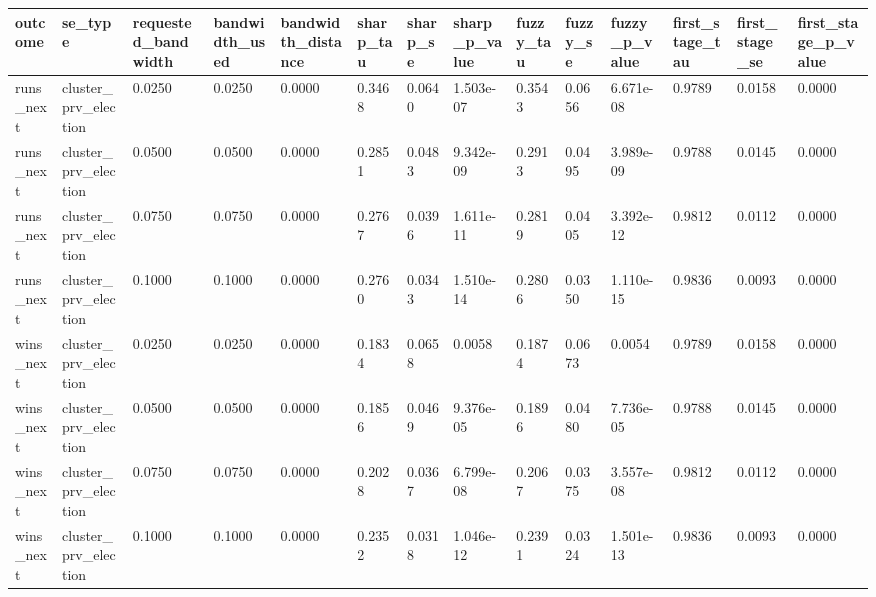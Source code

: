 \begin{tabular}{llllllllllllll}
\toprule
outcome & se\_type & requested\_bandwidth & bandwidth\_used & bandwidth\_distance & sharp\_tau & sharp\_se & sharp\_p\_value & fuzzy\_tau & fuzzy\_se & fuzzy\_p\_value & first\_stage\_tau & first\_stage\_se & first\_stage\_p\_value \\
\midrule
runs\_next & cluster\_prv\_election & 0.0250 & 0.0250 & 0.0000 & 0.3468 & 0.0640 & 1.503e-07 & 0.3543 & 0.0656 & 6.671e-08 & 0.9789 & 0.0158 & 0.0000 \\
runs\_next & cluster\_prv\_election & 0.0500 & 0.0500 & 0.0000 & 0.2851 & 0.0483 & 9.342e-09 & 0.2913 & 0.0495 & 3.989e-09 & 0.9788 & 0.0145 & 0.0000 \\
runs\_next & cluster\_prv\_election & 0.0750 & 0.0750 & 0.0000 & 0.2767 & 0.0396 & 1.611e-11 & 0.2819 & 0.0405 & 3.392e-12 & 0.9812 & 0.0112 & 0.0000 \\
runs\_next & cluster\_prv\_election & 0.1000 & 0.1000 & 0.0000 & 0.2760 & 0.0343 & 1.510e-14 & 0.2806 & 0.0350 & 1.110e-15 & 0.9836 & 0.0093 & 0.0000 \\
wins\_next & cluster\_prv\_election & 0.0250 & 0.0250 & 0.0000 & 0.1834 & 0.0658 & 0.0058 & 0.1874 & 0.0673 & 0.0054 & 0.9789 & 0.0158 & 0.0000 \\
wins\_next & cluster\_prv\_election & 0.0500 & 0.0500 & 0.0000 & 0.1856 & 0.0469 & 9.376e-05 & 0.1896 & 0.0480 & 7.736e-05 & 0.9788 & 0.0145 & 0.0000 \\
wins\_next & cluster\_prv\_election & 0.0750 & 0.0750 & 0.0000 & 0.2028 & 0.0367 & 6.799e-08 & 0.2067 & 0.0375 & 3.557e-08 & 0.9812 & 0.0112 & 0.0000 \\
wins\_next & cluster\_prv\_election & 0.1000 & 0.1000 & 0.0000 & 0.2352 & 0.0318 & 1.046e-12 & 0.2391 & 0.0324 & 1.501e-13 & 0.9836 & 0.0093 & 0.0000 \\
\bottomrule
\end{tabular}
